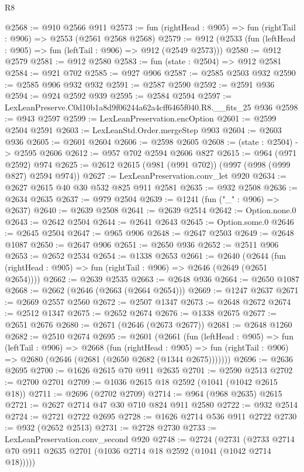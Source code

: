 \begin{lexlean}{R8}
\begin{coremodule}
@2568 := @910 @2566 @911
@2573 := fun (rightHead : @905) => fun (rightTail : @906) => @2553 (@2561 @2568 @2568)
@2579 := @912 (@2533 (fun (leftHead : @905) => fun (leftTail : @906) => @912 (@2549 @2573)))
@2580 := @912 @2579
@2581 := @912 @2580
@2583 := fun (state : @2504) => @912 @2581
@2584 := @921 @702
@2585 := @927 @906
@2587 := @2585 @2503 @932
@2590 := @2585 @906 @932 @932
@2591 := @2587 @2590
@2592 := @2591 @936
@2594 := @924 @2592 @939
@2595 := @2584 @2594
@2597 := LexLeanPreserve.C0d10b1a8d9f06244a62a4cff6465f040.R8.__fits_25 @936
@2598 := @943 @2597
@2599 := LexLeanPreservation.encOption
@2601 := @2599 @2504 @2591
@2603 := LexLeanStd.Order.mergeStep @903
@2604 := @2603 @936
@2605 := @2601 @2604
@2606 := @2598 @2605
@2608 := (state : @2504) -> @2595 @2606
@2612 := @957 @702 @2594 @2606 @827
@2615 := @964 (@971 @2592) @974
@2625 := @2612 @2615 (@981 (@991 @702)) (@997 (@998 (@999 @827) @2594 @974))
@2627 := LexLeanPreservation.conv_let @920
@2634 := @2627 @2615 @40 @30 @532 @825 @911 @2581
@2635 := @932 @2508
@2636 := @2634 @2635
@2637 := @979 @2504
@2639 := @1241 (fun ("_" : @906) => @2637)
@2640 := @2639 @2508
@2641 := @2639 @2514
@2642 := Option.none.{0}
@2643 := @2642 @2504
@2644 := @2641 @2643
@2645 := Option.some.{0}
@2646 := @2645 @2504
@2647 := @965 @906
@2648 := @2647 @2503
@2649 := @2648 @1087
@2650 := @2647 @906
@2651 := @2650 @936
@2652 := @2511 @906
@2653 := @2652 @2534
@2654 := @1338 @2653
@2661 := @2640
    (@2644 (fun (rightHead : @905) => fun (rightTail : @906) => @2646 (@2649 (@2651 @2654))))
@2662 := @2639 @2535
@2663 := @2648 @936
@2664 := @2650 @1087
@2668 := @2662 (@2646 (@2663 (@2664 @2654)))
@2669 := @1247 @2637
@2671 := @2669 @2557 @2560
@2672 := @2507 @1347
@2673 := @2648 @2672
@2674 := @2512 @1347
@2675 := @2652 @2674
@2676 := @1338 @2675
@2677 := @2651 @2676
@2680 := @2671 (@2646 (@2673 @2677))
@2681 := @2648 @1260
@2682 := @2510 @2674
@2695 := @2601
    (@2661
      (fun (leftHead : @905) =>
      fun (leftTail : @906) =>
      @2668
        (fun (rightHead : @905) =>
        fun (rightTail : @906) => @2680 (@2646 (@2681 (@2650 @2682 (@1344 @2675)))))))
@2696 := @2636 @2695
@2700 := @1626 @2615 @70 @911 @2635
@2701 := @2590 @2513
@2702 := @2700 @2701
@2709 := @1036 @2615 @18 @2592 (@1041 (@1042 @2615 @18))
@2711 := @2696 (@2702 @2709)
@2714 := @964 (@968 @2635) @2615
@2721 := @2627 @2714 @47 @30 @710 @824 @911 @2580
@2722 := @932 @2514
@2724 := @2721 @2722 @2695
@2728 := @1626 @2714 @536 @911 @2722
@2730 := @932 (@2652 @2513)
@2731 := @2728 @2730
@2733 := LexLeanPreservation.conv_second @920
@2748 := @2724
    (@2731 (@2733 @2714 @70 @911 @2635 @2701 (@1036 @2714 @18 @2592 (@1041 (@1042 @2714 @18)))))

\end{coremodule}
\end{lexlean}
